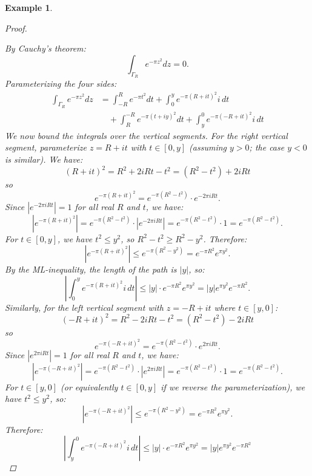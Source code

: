 \documentclass[a4paper]{article}
\newtheorem{eg}[thm]{Example}
\begin{document}
\begin{eg}
\begin{proof}
\begin{center}
        \end{center}
        By Cauchy's theorem:
        \[
        \int_{\Gamma_R}e^{-\pi z^2}dz=0
        .\]
        Parameterizing the four sides:
        \begin{align*}
            \int_{\Gamma_R}e^{-\pi z^2}dz &= \int_{-R}^{R}e^{-\pi t^2}dt + \int_{0}^{y}e^{-\pi(R+it)^2}i\,dt \\
            &\quad + \int_{R}^{-R}e^{-\pi(t+iy)^2}dt + \int_{y}^{0}e^{-\pi(-R+it)^2}i\,dt
        \end{align*}
        We now bound the integrals over the vertical segments. For the right vertical segment, parameterize $z=R+it$ with $t\in[0,y]$ (assuming $y>0$; the case $y<0$ is similar). We have:
        \[
        (R+it)^2 = R^2 + 2iRt - t^2 = (R^2-t^2) + 2iRt
        \]
        so
        \[
        e^{-\pi(R+it)^2} = e^{-\pi(R^2-t^2)} \cdot e^{-2\pi iRt}
        .\]
        Since $|e^{-2\pi iRt}| = 1$ for all real $R$ and $t$, we have:
        \[
        |e^{-\pi(R+it)^2}| = e^{-\pi(R^2-t^2)} \cdot |e^{-2\pi iRt}| = e^{-\pi(R^2-t^2)} \cdot 1 = e^{-\pi(R^2-t^2)}
        .\]
        For $t\in[0,y]$, we have $t^2 \leq y^2$, so $R^2-t^2 \geq R^2-y^2$. Therefore:
        \[
        |e^{-\pi(R+it)^2}| \leq e^{-\pi(R^2-y^2)} = e^{-\pi R^2}e^{\pi y^2}
        .\]
        By the ML-inequality, the length of the path is $|y|$, so:
        \[
        \left|\int_{0}^{y}e^{-\pi(R+it)^2}i\,dt\right| \leq |y| \cdot e^{-\pi R^2}e^{\pi y^2} = |y|e^{\pi y^2}e^{-\pi R^2}
        .\]
        Similarly, for the left vertical segment with $z=-R+it$ where $t\in[y,0]$:
        \[
        (-R+it)^2 = R^2 - 2iRt - t^2 = (R^2-t^2) - 2iRt
        \]
        so
        \[
        e^{-\pi(-R+it)^2} = e^{-\pi(R^2-t^2)} \cdot e^{2\pi iRt}
        .\]
        Since $|e^{2\pi iRt}| = 1$ for all real $R$ and $t$, we have:
        \[
        |e^{-\pi(-R+it)^2}| = e^{-\pi(R^2-t^2)} \cdot |e^{2\pi iRt}| = e^{-\pi(R^2-t^2)} \cdot 1 = e^{-\pi(R^2-t^2)}
        .\]
        For $t\in[y,0]$ (or equivalently $t\in[0,y]$ if we reverse the parameterization), we have $t^2 \leq y^2$, so:
        \[
        |e^{-\pi(-R+it)^2}| \leq e^{-\pi(R^2-y^2)} = e^{-\pi R^2}e^{\pi y^2}
        .\]
        Therefore:
        \[
        \left|\int_{y}^{0}e^{-\pi(-R+it)^2}i\,dt\right| \leq |y| \cdot e^{-\pi R^2}e^{\pi y^2} = |y|e^{\pi y^2}e^{-\pi R^2}
\]
\end{proof}
\end{eg}
\end{document}
